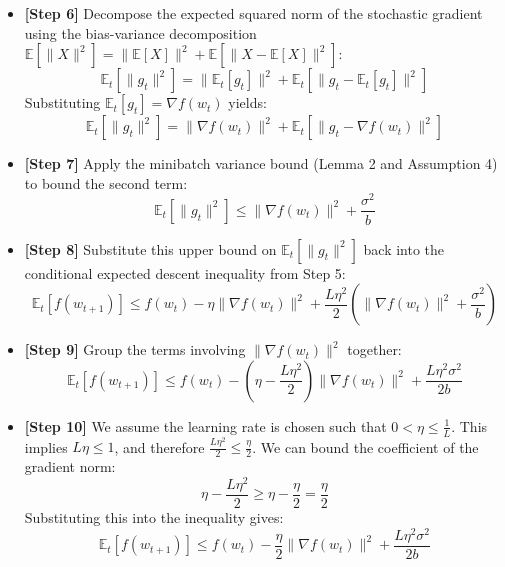 \documentclass{article}
\begin{document}
\begin{itemize}
    \item \textbf{[Step 6]} Decompose the expected squared norm of the stochastic gradient using the bias-variance decomposition $\mathbb{E}[\|X\|^2] = \|\mathbb{E}[X]\|^2 + \mathbb{E}[\|X - \mathbb{E}[X]\|^2]$:
    \begin{equation}
        \mathbb{E}_t[\|g_t\|^2] = \|\mathbb{E}_t[g_t]\|^2 + \mathbb{E}_t[\|g_t - \mathbb{E}_t[g_t]\|^2]
    \end{equation}
    Substituting $\mathbb{E}_t[g_t] = \nabla f(w_t)$ yields:
    \begin{equation}
        \mathbb{E}_t[\|g_t\|^2] = \|\nabla f(w_t)\|^2 + \mathbb{E}_t[\|g_t - \nabla f(w_t)\|^2]
    \end{equation}
    
    \item \textbf{[Step 7]} Apply the minibatch variance bound (Lemma 2 and Assumption 4) to bound the second term:
    \begin{equation}
        \mathbb{E}_t[\|g_t\|^2] \leq \|\nabla f(w_t)\|^2 + \frac{\sigma^2}{b}
    \end{equation}
    
    \item \textbf{[Step 8]} Substitute this upper bound on $\mathbb{E}_t[\|g_t\|^2]$ back into the conditional expected descent inequality from Step 5:
    \begin{equation}
        \mathbb{E}_t[f(w_{t+1})] \leq f(w_t) - \eta \|\nabla f(w_t)\|^2 + \frac{L \eta^2}{2} \left( \|\nabla f(w_t)\|^2 + \frac{\sigma^2}{b} \right)
    \end{equation}
    
    \item \textbf{[Step 9]} Group the terms involving $\|\nabla f(w_t)\|^2$ together:
    \begin{equation}
        \mathbb{E}_t[f(w_{t+1})] \leq f(w_t) - \left( \eta - \frac{L \eta^2}{2} \right) \|\nabla f(w_t)\|^2 + \frac{L \eta^2 \sigma^2}{2b}
    \end{equation}
    
    \item \textbf{[Step 10]} We assume the learning rate is chosen such that $0 < \eta \leq \frac{1}{L}$. This implies $L\eta \leq 1$, and therefore $\frac{L \eta^2}{2} \leq \frac{\eta}{2}$. We can bound the coefficient of the gradient norm:
    \begin{equation}
        \eta - \frac{L \eta^2}{2} \geq \eta - \frac{\eta}{2} = \frac{\eta}{2}
    \end{equation}
    Substituting this into the inequality gives:
    \begin{equation}
        \mathbb{E}_t[f(w_{t+1})] \leq f(w_t) - \frac{\eta}{2} \|\nabla f(w_t)\|^2 + \frac{L \eta^2 \sigma^2}{2b}
    \end{equation}
\end{itemize}
\end{document}
